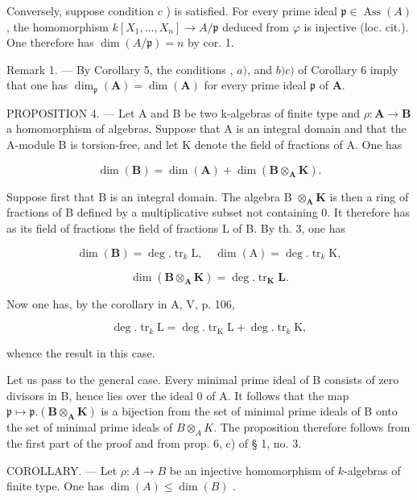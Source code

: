 Conversely, suppose condition \(c\) ) is satisfied. For every prime ideal \(\mathfrak{p} \in \operatorname{Ass}(A)\) , the homomorphism \(k[X_1, ..., X_n] \to A/\mathfrak{p}\) deduced from \(\varphi\) is injective (loc. cit.). One therefore has \(\dim(A/\mathfrak{p}) = n\) by cor. 1.

Remark 1. --- By Corollary 5, the conditions , \(a)\), and \(b)\)\(c)\) of Corollary 6 imply that one has \(\dim_{\mathfrak{p}}(\mathbf{A}) = \dim(\mathbf{A})\) for every prime ideal \(\mathfrak{p}\) of \(\mathbf{A}\).

PROPOSITION 4. --- Let A and B be two k-algebras of finite type and \(\rho: \mathbf{A} \to \mathbf{B}\) a homomorphism of algebras. Suppose that A is an integral domain and that the A-module B is torsion-free, and let K denote the field of fractions of A. One has

\[
\dim (\mathbf {B}) = \dim (\mathbf {A}) + \dim (\mathbf {B} \otimes_ {\mathbf {A}} \mathbf {K}).
\]

Suppose first that B is an integral domain. The algebra B \(\otimes_{\mathbf{A}} \mathbf{K}\) is then a ring of fractions of B defined by a multiplicative subset not containing 0. It therefore has as its field of fractions the field of fractions L of B. By th. 3, one has

\[
\dim (\mathbf {B}) = \deg . \operatorname{tr} _ {k} \mathrm{L}, \quad \dim (\mathrm{A}) = \deg . \operatorname{tr} _ {k} \mathrm{K},
\]

\[
\dim (\mathbf {B} \otimes_ {\mathbf {A}} \mathbf {K}) = \deg . \operatorname{tr} _ {\mathbf {K}} \mathbf {L}.
\]

Now one has, by the corollary in A, V, p. 106,

\[
\deg . \operatorname{tr} _ {k} \mathrm{L} = \deg . \operatorname{tr} _ {\mathrm{K}} \mathrm{L} + \deg . \operatorname{tr} _ {k} \mathrm{K},
\]

whence the result in this case.

Let us pass to the general case. Every minimal prime ideal  of B consists of zero divisors in B, hence lies over the ideal 0 of A. It follows that the map \(\mathfrak{p} \mapsto \mathfrak{p}.(\mathbf{B} \otimes_{\mathbf{A}} \mathbf{K})\) is a bijection from the set of minimal prime ideals of B onto the set of minimal prime ideals of \(B \otimes_{A} K\). The proposition therefore follows from the first part of the proof and from prop. 6, c) of § 1, no. 3.

COROLLARY. --- Let \(\rho: A \to B\) be an injective homomorphism of \(k\)-algebras of finite type. One has \(\dim(A) \leqslant \dim(B)\) .

